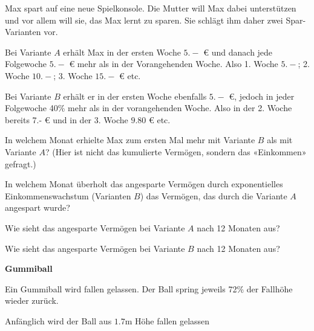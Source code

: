 Max spart auf eine neue Spielkonsole. Die Mutter will Max dabei unterstützen und vor allem will sie, das Max lernt zu sparen.
Sie schlägt ihm daher zwei Spar-Varianten vor.

Bei Variante $A$ erhält Max in der ersten Woche $5.-$ \euro{} und danach jede Folgewoche $5.-$ \euro{} mehr als in der Vorangehenden Woche. Also 1. Woche $5.-$; 2. Woche $10.-$; 3. Woche $15.-$ \euro{} etc.

Bei Variante $B$ erhält er in der ersten Woche ebenfalls $5.-$ \euro{}, jedoch in jeder Folgewoche 40\% mehr als in der vorangehenden Woche. Also in der 2. Woche \zB bereits 7.- \euro{} und in der 3. Woche $9.80$ \euro{} etc.


\begin{bbwAufgabenBlock}
\item In welchem Monat erhielte Max zum ersten Mal mehr mit Variante $B$ als mit Variante $A$? (Hier ist nicht das kumulierte Vermögen, sondern das «Einkommen» gefragt.)

\item In welchem Monat überholt das angesparte Vermögen durch exponentielles Einkommenswachstum (Varianten $B$) das Vermögen, das durch die Variante $A$ angespart wurde?

\item Wie sieht das angesparte Vermögen bei Variante $A$ nach 12 Monaten aus?

\item Wie sieht das angesparte Vermögen bei Variante $B$ nach 12 Monaten aus?
\end{bbwAufgabenBlock}
\platzFuerBerechnungenBisEndeSeite{}




\bbwActAufgabenNr{} \textbf{Gummiball}

Ein Gummiball wird fallen gelassen. Der Ball spring jeweils 72\% der Fallhöhe wieder zurück.

Anfänglich wird der Ball aus $1.7 \textrm{m}$ Höhe fallen gelassen

